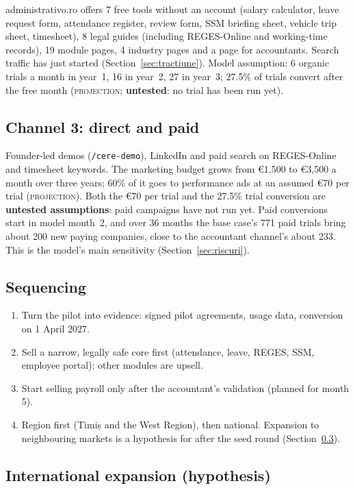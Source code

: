 \documentclass[10pt,a4paper]{article}
\newcommand{\fisier}[1]{\nolinkurl{#1}}
\newcommand{\proj}{\textcolor{brandTeal}{\textsc{projection}}}
\begin{document}
administrativo.ro offers 7 free tools without an account (salary calculator, leave request form,
attendance register, review form, SSM briefing sheet, vehicle trip sheet, timesheet), 8 legal guides
(including REGES-Online and working-time records), 19 module pages, 4 industry pages and a page for
accountants. Search traffic has just started (Section~\ref{sec:tractiune}). Model assumption: 6 organic trials a month
in year~1, 16 in year~2, 27 in year~3; 27.5\% of trials convert after the free month (\proj;
\textbf{untested}: no trial has been run yet).

\subsection{Channel 3: direct and paid}

Founder-led demos (\fisier{/cere-demo}), LinkedIn and paid search on REGES-Online and timesheet
keywords. The marketing budget grows from €1,500 to €3,500 a month over three years; 60\% of it
goes to performance ads at an assumed €70 per trial (\proj). Both the €70 per trial and the
27.5\% trial conversion are \textbf{untested assumptions}: paid campaigns have not run yet. Paid
conversions start in model month~2, and over 36 months the base case's 771 paid trials bring
about 200 new paying companies, close to the accountant channel's about 233. This is the model's main sensitivity
(Section~\ref{sec:riscuri}).

\subsection{Sequencing}

\begin{enumerate}[leftmargin=1.6em]
\item Turn the pilot into evidence: signed pilot agreements, usage data, conversion on 1 April 2027.
\item Sell a narrow, legally safe core first (attendance, leave, REGES, SSM, employee portal);
  other modules are upsell.
\item Start selling payroll only after the accountant's validation (planned for month 5).
\item Region first (Timiș and the West Region), then national. Expansion to neighbouring markets is a
  hypothesis for after the seed round (Section~\ref{sec:international}).
\end{enumerate}

\subsection{International expansion (hypothesis)}\label{sec:international}\nobreak
\end{document}
